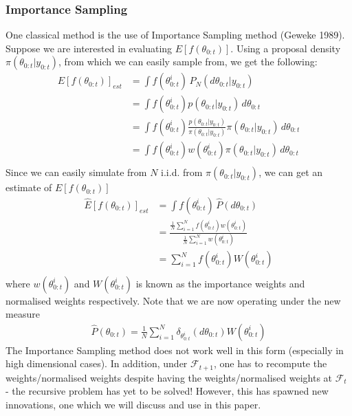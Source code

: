 \documentclass[11pt]{article}
\theoremstyle{definition}
\begin{document}
\subsubsection{Importance Sampling}
One classical method is the use of Importance Sampling method (Geweke 1989). Suppose we are interested in evaluating $E[f(\theta_{0:t})]$. Using a proposal density $\pi(\theta_{0:t}|y_{0:t})$, from which we can easily sample from, we get the following:
\begin{equation}
	\begin{aligned}
		E[f(\theta_{0:t})]_{est} &= \int f(\theta_{0:t}^{i}) \,P_{N}(d\theta_{0:t}|y_{0:t}) \\
		&= \int f(\theta_{0:t}^{i})p(\theta_{0:t}|y_{0:t}) \,d\theta_{0:t} \\
		&= \int f(\theta_{0:t}^{i})\frac{p(\theta_{0:t}|y_{0:t})}{\pi(\theta_{0:t}|y_{0:t})}\pi(\theta_{0:t}|y_{0:t})\,d\theta_{0:t} \\
		&= \int f(\theta_{0:t}^{i})w(\theta_{0:t}^{i})\pi(\theta_{0:t}|y_{0:t})\,d\theta_{0:t} \\
	\end{aligned}
\end{equation}
Since we can easily simulate from $N$ i.i.d. from $\pi(\theta_{0:t}|y_{0:t})$, we can get an estimate of $E[f(\theta_{0:t})]$
\begin{equation}
	\begin{aligned}
		\hat{E}[f(\theta_{0:t})]_{est} &= \int f(\theta_{0:t}^{i})\,\hat{P}(d\theta_{0:t}) \\
		&=\frac{\frac{1}{N}\sum_{i=1}^{N}f(\theta_{0:t}^{i})w(\theta_{0:t}^{i})}{\frac{1}{N}\sum_{i=1}^{N}w(\theta_{0:t}^{i})} \\
		&= \sum_{i=1}^{N}f(\theta_{0:t}^{i})W(\theta_{0:t}^{i}) \\
	\end{aligned}
\end{equation}
where $w(\theta_{0:t}^{i})$ and $W(\theta_{0:t}^{i})$ is known as the importance weights and normalised weights respectively. Note that we are now operating under the new measure 
\begin{equation}
	\begin{aligned}
		\hat{P}(\theta_{0:t}) = \frac{1}{N}\sum_{i=1}^{N}\delta_{\theta_{0:t}^{i}}(d\theta_{0:t})W(\theta_{0:t}^{i})
	\end{aligned}
\end{equation}
The Importance Sampling method does not work well in this form (especially in high dimensional cases). In addition, under $\mathcal{F}_{t+1}$, one has to recompute the weights/normalised weights despite having the weights/normalised weights at $\mathcal{F}_{t}$ - the recursive problem has yet to be solved! However, this has spawned new innovations, one which we will discuss and use in this paper.
\end{document}
